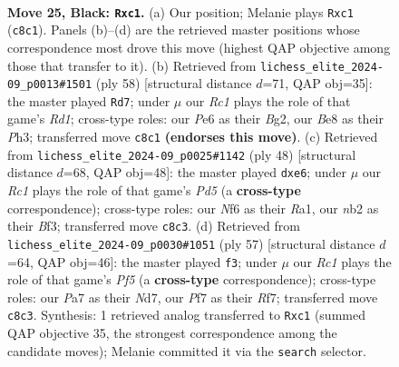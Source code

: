 \documentclass[11pt]{article}
\begin{document}
\clearpage

\begin{figure}[p]\centering
\begin{subfigure}{0.46\textwidth}\centering
\resizebox{\linewidth}{!}{%
\newchessgame
\chessboard[
  setfen={2r1b1k1/p4pp1/R3pn2/1p5p/3P1P2/1P4PP/1N2P3/2R2BK1 b - - 0 25},
  showmover=false,
  pgfstyle=straightmove, color=movearrow, markmove={c8-c1}
]}
\caption{}
\end{subfigure}\hfill
\begin{subfigure}{0.46\textwidth}\centering
\resizebox{\linewidth}{!}{%
\newchessgame
\chessboard[
  setfen={6k1/pp2b1p1/n1p1p2p/4P3/5P2/5NPP/Pr4BK/3R4 w - - 2 30},
  showmover=false,
  pgfstyle=straightmove, color=movearrow, markmove={d1-d7}
]}
\caption{}
\end{subfigure}
\\[4pt]
\begin{subfigure}{0.46\textwidth}\centering
\resizebox{\linewidth}{!}{%
\newchessgame
\chessboard[
  setfen={3r4/p4p2/1k2pbp1/1P1P4/1N1p4/3P1BPr/4PP2/R5K1 w - - 1 25},
  showmover=false,
  pgfstyle=straightmove, color=movearrow, markmove={d5-e6}
]}
\caption{}
\end{subfigure}\hfill
\begin{subfigure}{0.46\textwidth}\centering
\resizebox{\linewidth}{!}{%
\newchessgame
\chessboard[
  setfen={6k1/R2n1rb1/1p1P3p/1Pn1p3/1p3p2/6PP/2P2PB1/4R1K1 b - - 0 29},
  showmover=false,
  pgfstyle=straightmove, color=movearrow, markmove={f4-f3}
]}
\caption{}
\end{subfigure}
\caption{\textbf{Move 25, Black: \texttt{Rxc1}.} (a) Our position; Melanie plays \texttt{Rxc1} (\texttt{c8c1}). Panels (b)--(d) are the retrieved master positions whose correspondence most drove this move (highest QAP objective among those that transfer to it). (b) Retrieved from \texttt{lichess\_elite\_2024-09\_p0013\#1501} (ply 58) [structural distance $d$=71, QAP obj=35]: the master played \texttt{Rd7}; under $\mu$ our \emph{Rc1} plays the role of that game's \emph{Rd1}; cross-type roles: our \emph{P}e6 as their \emph{B}g2, our \emph{B}e8 as their \emph{P}h3; transferred move \texttt{c8c1} \textbf{(endorses this move)}. (c) Retrieved from \texttt{lichess\_elite\_2024-09\_p0025\#1142} (ply 48) [structural distance $d$=68, QAP obj=48]: the master played \texttt{dxe6}; under $\mu$ our \emph{Rc1} plays the role of that game's \emph{Pd5} (a \textbf{cross-type} correspondence); cross-type roles: our \emph{N}f6 as their \emph{R}a1, our \emph{n}b2 as their \emph{B}f3; transferred move \texttt{c8c3}. (d) Retrieved from \texttt{lichess\_elite\_2024-09\_p0030\#1051} (ply 57) [structural distance $d$=64, QAP obj=46]: the master played \texttt{f3}; under $\mu$ our \emph{Rc1} plays the role of that game's \emph{Pf5} (a \textbf{cross-type} correspondence); cross-type roles: our \emph{P}a7 as their \emph{N}d7, our \emph{P}f7 as their \emph{R}f7; transferred move \texttt{c8c3}. Synthesis: 1 retrieved analog transferred to \texttt{Rxc1} (summed QAP objective 35, the strongest correspondence among the candidate moves); Melanie committed it via the \texttt{search} selector.}
\label{fig:thought-m49}
\end{figure}
\end{document}
